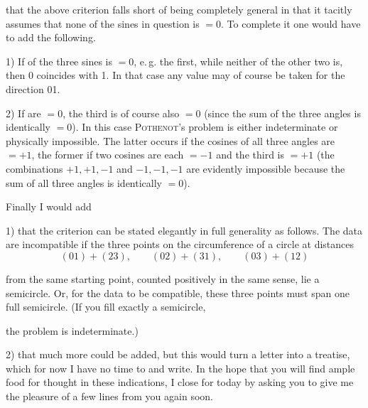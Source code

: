 %
that the above criterion falls short of being completely general in that it tacitly assumes that none of the sines in question is $=0$. To complete it one would have to add the following.

1) If  of the three sines is $=0$, e.\,g. the first, while neither of the other two is, then 0 coincides with 1. In that case any value may of course be taken for the direction 01.

2) If  are $=0$, the third is of course also $=0$ (since the sum of the three angles is identically $=0$). In this case \textsc{Pothenot}'s problem is either indeterminate or physically impossible. The latter occurs if the cosines of all three angles are $=+1$, the former if two cosines are each $=-1$ and the third is $=+1$ (the combinations $+1,+1,-1$ and $-1,-1,-1$ are evidently impossible because the sum of all three angles is identically $=0$).

Finally I would add

1) that the criterion can be stated elegantly in full generality as follows. The data are incompatible if the three points on the circumference of a circle at distances
\[
(01)+(23),\qquad (02)+(31),\qquad (03)+(12)
\]
\begin{minipage}{\linewidth}\raggedright\noindent from the same starting point, counted positively in the same sense, lie  a semicircle. Or, for the data to be compatible, these three points must span  one full semi\-circle. (If you fill exactly a semicircle,

\begin{center}\end{center}

the problem is indeterminate.)
\end{minipage}

2) that much more could be added, but this would turn a letter into a treatise, which for now I have no time to  and write. In the hope that you will find ample food for thought in these indications, I close for today by asking you to give me the pleasure of a few lines from you again soon.


